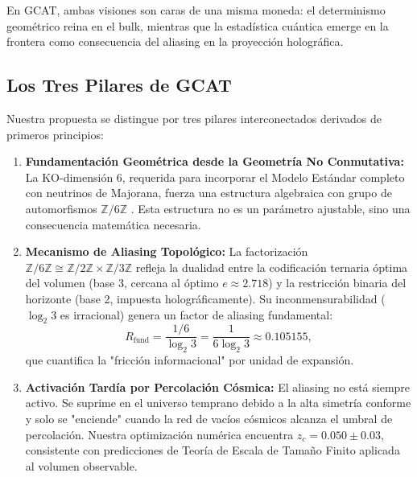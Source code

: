 \documentclass[12pt, a4paper]{article}
\theoremstyle{plain}
\theoremstyle{definition}
\begin{document}
En GCAT, ambas visiones son caras de una misma moneda: el determinismo geométrico 
reina en el bulk, mientras que la estadística cuántica emerge en la frontera 
como consecuencia del aliasing en la proyección holográfica.

\subsection{Los Tres Pilares de GCAT}

Nuestra propuesta se distingue por tres pilares interconectados derivados de 
primeros principios:

\begin{enumerate}
    \item \textbf{Fundamentación Geométrica desde la Geometría No Conmutativa:} 
          La KO-dimensión 6, requerida para incorporar el Modelo Estándar completo 
          con neutrinos de Majorana, fuerza una estructura algebraica con grupo 
          de automorfismos $\mathbb{Z}/6\mathbb{Z}$ \cite{Connes2008, Chamseddine2012}. 
          Esta estructura no es un parámetro ajustable, sino una consecuencia 
          matemática necesaria.
    
    \item \textbf{Mecanismo de Aliasing Topológico:} La factorización 
          $\mathbb{Z}/6\mathbb{Z} \cong \mathbb{Z}/2\mathbb{Z} \times \mathbb{Z}/3\mathbb{Z}$ 
          refleja la dualidad entre la codificación ternaria óptima del volumen 
          (base 3, cercana al óptimo $e \approx 2.718$) y la restricción binaria 
          del horizonte (base 2, impuesta holográficamente). Su inconmensurabilidad 
          ($\log_2 3$ es irracional) genera un factor de aliasing fundamental:
          \begin{equation}
          R_{\text{fund}} = \frac{1/6}{\log_2 3} = \frac{1}{6\log_2 3} \approx 0.105155,
          \label{eq:R_fund_intro}
          \end{equation}
          que cuantifica la "fricción informacional" por unidad de expansión.
    
    \item \textbf{Activación Tardía por Percolación Cósmica:} El aliasing no está 
          siempre activo. Se suprime en el universo temprano debido a la alta 
          simetría conforme y solo se "enciende" cuando la red de vacíos cósmicos 
          alcanza el umbral de percolación. Nuestra optimización numérica encuentra 
          $z_c = 0.050 \pm 0.03$, consistente con predicciones de Teoría de Escala 
          de Tamaño Finito aplicada al volumen observable.
\end{enumerate}
\end{document}
